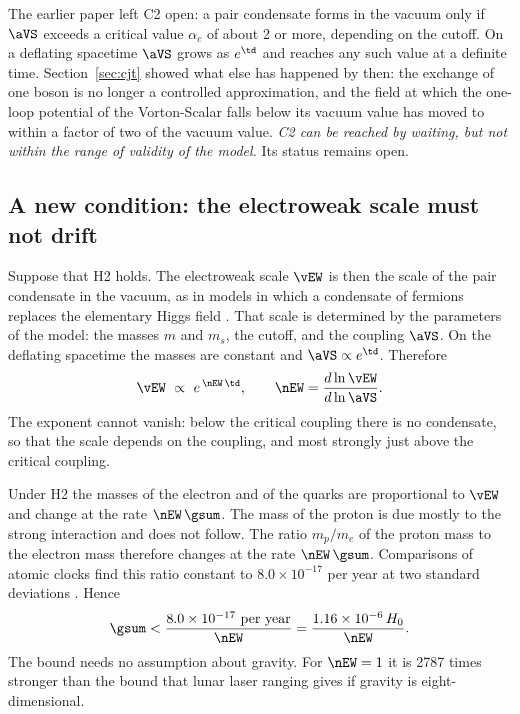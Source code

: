 The earlier paper left C2 open: a pair condensate forms in the vacuum only if $\aVS$ exceeds a
critical value $\alpha_c$ of about 2 or more, depending on the cutoff. On a deflating spacetime
$\aVS$ grows as $e^{\td}$ and reaches any such value at a definite time. Section~\ref{sec:cjt} showed
what else has happened by then: the exchange of one boson is no longer a controlled approximation,
and the field at which the one-loop potential of the Vorton-Scalar falls below its vacuum value has
moved to within a factor of two of the vacuum value. \emph{C2 can be reached by waiting, but not
within the range of validity of the model.} Its status remains open.

\subsection{A new condition: the electroweak scale must not drift}

Suppose that H2 holds. The electroweak scale $\vEW$ is then the scale of the pair condensate in the
vacuum, as in models in which a condensate of fermions replaces the elementary Higgs field
\cite{BardeenHillLindner1990}. That scale is determined by the parameters of the model: the masses
$m$ and $m_s$, the cutoff, and the coupling $\aVS$. On the deflating spacetime the masses are constant
and $\aVS\propto e^{\td}$. Therefore
\begin{equation}
\vEW\ \propto\ e^{\,\nEW\,\td},\qquad\nEW=\frac{d\ln\vEW}{d\ln\aVS}.
\label{eq:nEW}
\end{equation}
The exponent cannot vanish: below the critical coupling there is no condensate, so that the scale
depends on the coupling, and most strongly just above the critical coupling.

Under H2 the masses of the electron and of the quarks are proportional to $\vEW$ and change at the
rate $\nEW\,\gsum$. The mass of the proton is due mostly to the strong interaction and does not
follow. The ratio $m_p/m_e$ of the proton mass to the electron mass therefore changes at the rate
$\nEW\,\gsum$. Comparisons of atomic clocks find this ratio constant to $8.0\times10^{-17}$ per year
at two standard deviations \cite{Lange2021}. Hence
\begin{equation}
\gsum<\frac{8.0\times10^{-17}\ \text{per year}}{\nEW}=\frac{1.16\times10^{-6}\,H_0}{\nEW}.
\label{eq:clockbound}
\end{equation}
The bound needs no assumption about gravity. For $\nEW=1$ it is 2787 times stronger than the bound
that lunar laser ranging gives if gravity is eight-dimensional.


